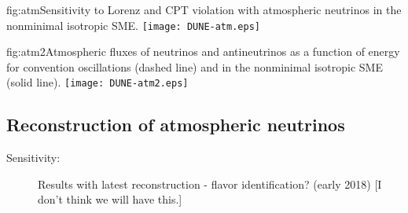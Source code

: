 \begin{dunefigure}{fig:atm}{Sensitivity to Lorenz and CPT violation with atmospheric neutrinos in the nonminimal isotropic SME.}
\texttt{[image: DUNE-atm.eps]}
\end{dunefigure}

\begin{dunefigure}{fig:atm2}{Atmospheric fluxes of neutrinos and antineutrinos as a function of energy for convention oscillations (dashed line) and in the nonminimal isotropic SME (solid line).}
\texttt{[image: DUNE-atm2.eps]}
\end{dunefigure}


\subsection{Reconstruction of atmospheric neutrinos}
\label{sec:nonaccel-atm-reco}

\begin{description}
\item[Sensitivity:] Results with latest reconstruction - flavor identification?  (early 2018) [I don't think we will have this.]
\end{description}